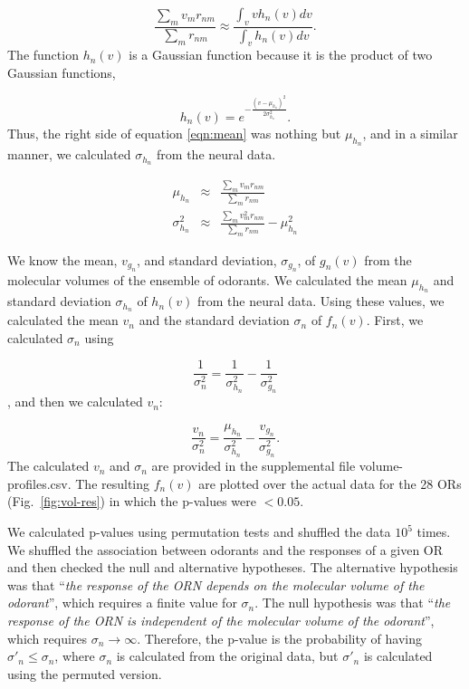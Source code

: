 \documentclass[fleqn,11pt]{wlscirep}
\newcommand{\numberofreceptors}{ 28 }
\begin{document}
\begin{equation}
	\frac{\displaystyle \sum_{m} v_m r_{nm}}{\displaystyle \sum_{m} r_{nm}} \approx \frac{\displaystyle \int_v v h_n(v) dv}{ \displaystyle \int_v  h_n(v) dv }.
	\label{eqn:mean}
\end{equation}
The function $h_n(v)$ is a Gaussian function because it is the product of two Gaussian functions, 

\begin{equation}
h_n(v) = e^{-\frac{(v-\mu_{h_n})^2}{2\sigma_{h_n}^2}}. 
\end{equation}
Thus, the right side of equation \ref{eqn:mean} was nothing but $\mu_{h_n}$, and 
in a similar manner, we calculated $\sigma_{h_n}$ from the neural data.

\begin{eqnarray}
	\mu_{h_n} &\approx& \frac{\displaystyle \sum_{m} v_m r_{nm}}{\displaystyle \sum_{m} r_{nm}} \\
	\sigma_{h_n}^2 &\approx& \frac{\displaystyle \sum_{m} v_m^2 r_{nm}}{\displaystyle \sum_{m} r_{nm}} - \mu_{h_n}^2
	\label{eqn:final_h}
\end{eqnarray}

We know the mean, $v_{g_n}$, and standard deviation, $\sigma_{g_n}$, of $g_n(v)$ from the molecular volumes of the ensemble of odorants. 
We calculated the mean $\mu_{h_n}$ and standard deviation $\sigma_{h_n}$ of $h_n(v)$ from the neural data.
Using these values, we calculated the mean $v_n$ and the standard deviation $\sigma_n$ of $f_n(v)$.
First, we calculated $\sigma_n$ using 

\begin{equation}
	\frac{1}{\sigma_n^2} = \frac{1}{\sigma^2_{h_n}}  - \frac{1}{\sigma^2_{g_n}}
\end{equation},
and then we calculated $v_n$: 

\begin{equation}
	\frac{v_n}{\sigma_n^2}  =    \frac{\mu_{h_n}}{\sigma^2_{h_n}} - \frac{v_{g_n}}{\sigma^2_{g_n}}.
\end{equation}
The calculated $v_n$ and $\sigma_n$ are provided in the supplemental file volume-profiles.csv. 
The resulting $f_n(v)$ are plotted over the actual data for the \numberofreceptors ORs (Fig.~\ref{fig:vol-res})
in which the p-values were $<0.05$. 

We calculated p-values using permutation tests and shuffled the data $10^5$ times. 
We shuffled the association between odorants and the responses of a given OR and then checked the null and alternative hypotheses. 
The alternative hypothesis was that
``{\it the response of the ORN depends on the molecular volume of the odorant}'', 
which requires a finite value for $\sigma_n$. 
The null hypothesis was that 
``{\it the response of the ORN is independent of the molecular volume of the odorant}'',
which requires $\sigma_n \rightarrow \infty$. 
Therefore, the p-value is the probability of having $\sigma'_n\leq\sigma_n$, 
where $\sigma_n$ is calculated from the original data, but $\sigma'_n$ is calculated using the permuted version. 
\end{document}
